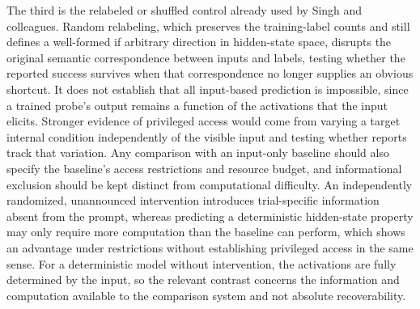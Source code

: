 \documentclass[11pt]{article}
\theoremstyle{definition}
\theoremstyle{remark}
\begin{document}
The third is the relabeled or shuffled control already used by Singh and colleagues. Random relabeling, which preserves the training-label counts and still defines a well-formed if arbitrary direction in hidden-state space, disrupts the original semantic correspondence between inputs and labels, testing whether the reported success survives when that correspondence no longer supplies an obvious shortcut. It does not establish that all input-based prediction is impossible, since a trained probe's output remains a function of the activations that the input elicits. Stronger evidence of privileged access would come from varying a target internal condition independently of the visible input and testing whether reports track that variation. Any comparison with an input-only baseline should also specify the baseline's access restrictions and resource budget, and informational exclusion should be kept distinct from computational difficulty. An independently randomized, unannounced intervention introduces trial-specific information absent from the prompt, whereas predicting a deterministic hidden-state property may only require more computation than the baseline can perform, which shows an advantage under restrictions without establishing privileged access in the same sense. For a deterministic model without intervention, the activations are fully determined by the input, so the relevant contrast concerns the information and computation available to the comparison system and not absolute recoverability.
\end{document}
